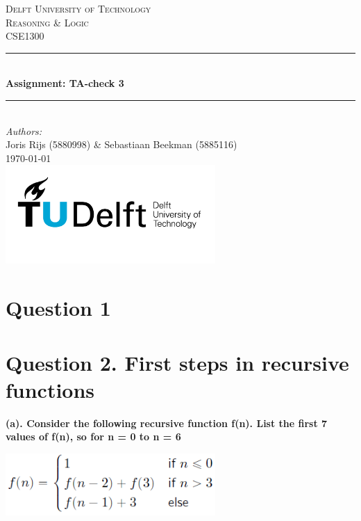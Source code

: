 \documentclass[a4paper]{article}
\begin{document}
\begin{titlepage}
    \newcommand{\HRule}{\rule{\linewidth}{0.5mm}}
    \center

    \textsc{\LARGE Delft University of Technology}\\[1cm]

    \textsc{\Large Reasoning \& Logic}\\[0.2cm]
    \textsc{\large CSE1300}\\[1cm]
    \HRule \\[0.8cm]
    { \huge \bfseries Assignment: TA-check 3}\\[0.7cm]
    \HRule \\[2cm]
    \large
    \emph{Authors:}\\
    Joris Rijs (5880998) \& Sebastiaan Beekman (5885116)\\[1.5cm]
    {\large \today}\\[5cm]
    \includegraphics[width=0.6\textwidth]{images/TU_delft_logo.jpg}\\[1cm]
    \vfill
\end{titlepage}

\newpage
\tableofcontents

\newpage
\section{Question 1}

\newpage
\section{Question 2. First steps in recursive functions}
\textbf{(a). Consider the following recursive function f(n). List the first 7 values of f(n), so for n = 0 to n = 6}
\begin{center}
    \includegraphics[width=0.6\textwidth]{images/2a.png}\\[1cm]
\end{center}
\end{document}
